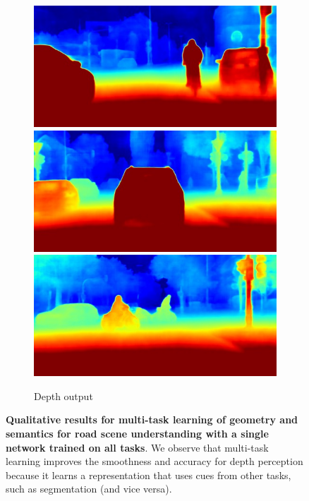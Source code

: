 \begin{figure}[t]
{\begin{subfigure}[t]{0.24\linewidth}
\begin{center}
		\includegraphics[width=\linewidth,trim={0px 60px 0 0px},clip]{qualitative/bonn_000045_000019_depth_prediction.jpg}
		\includegraphics[width=\linewidth,trim={0px 60px 0 0px},clip]{qualitative/munich_000021_000019_depth_prediction.jpg}
		\includegraphics[width=\linewidth,trim={0px 60px 0 0px},clip]{qualitative/munich_000042_000019_depth_prediction.jpg}
  \caption{Depth output}
\end{center}
\end{subfigure}}
	\caption[Qualitative results.]{\textbf{Qualitative results for multi-task learning of geometry and semantics for road scene understanding with a single network trained on all tasks}. We observe that multi-task learning improves the smoothness and accuracy for depth perception because it learns a representation that uses cues from other tasks, such as segmentation (and vice versa).}
	\label{fig:cityscapesqual}
\end{figure}

